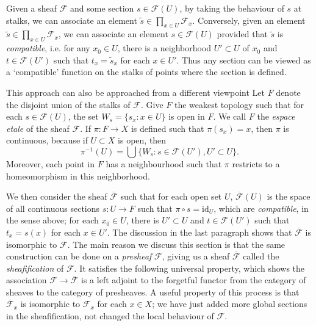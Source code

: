 Given a sheaf $\mathcal{F}$ and some section $s \in \mathcal{F}(U)$, by taking the behaviour of $s$ at stalks, we can associate an element $\tilde{s} \in \prod_{x \in U} \mathcal{F}_x$. Conversely, given an element $\tilde{s} \in \prod_{x \in U} \mathcal{F}_x$, we can associate an element $s \in \mathcal{F}(U)$ provided that $\tilde{s}$ is \emph{compatible}, i.e. for any $x_0 \in U$, there is a neighborhood $U' \subset U$ of $x_0$ and $t \in \mathcal{F}(U')$ such that $t_x = \tilde{s}_x$ for each $x \in U'$. Thus any section can be viewed as a `compatible' function on the stalks of points where the section is defined.

This approach can also be approached from a different viewpoint Let $F$ denote the disjoint union of the stalks of $\mathcal{F}$. Give $F$ the weakest topology such that for each $s \in \mathcal{F}(U)$, the set $W_s = \{ s_x : x \in U \}$ is open in $F$. We call $F$ the \emph{espace etale} of the sheaf $\mathcal{F}$. If $\pi: F \to X$ is defined such that $\pi(s_x) = x$, then $\pi$ is continuous, because if $U \subset X$ is open, then
%
\[ \pi^{-1}(U) = \bigcup \{ W_s : s \in \mathcal{F}(U'), U' \subset U \}. \]
%
Moreover, each point in $F$ has a neighbourhood such that $\pi$ restricts to a homeomorphism in this neighborhood.

We then consider the sheaf $\overline{\mathcal{F}}$ such that for each open set $U$, $\overline{\mathcal{F}}(U)$ is the space of all continuous sections $s: U \to F$ such that $\pi \circ s = \text{id}_U$, which are \emph{compatible}, in the sense above; for each $x_0 \in U$, there is $U' \subset U$ and $t \in \mathcal{F}(U')$ such that $t_x = s(x)$ for each $x \in U'$. The discussion in the last paragraph shows that $\overline{\mathcal{F}}$ is isomorphic to $\mathcal{F}$. The main reason we discuss this section is that the same construction can be done on a \emph{presheaf} $\mathcal{F}$, giving us a sheaf $\overline{\mathcal{F}}$ called the \emph{sheafification} of $\mathcal{F}$. It satisfies the following universal property, which shows the association $\mathcal{F} \to \overline{\mathcal{F}}$ is a left adjoint to the forgetful functor from the category of sheaves to the category of presheaves. A useful property of this process is that $\overline{\mathcal{F}}_x$ is isomorphic to $\mathcal{F}_x$ for each $x \in X$; we have just added more global sections in the sheafification, not changed the local behaviour of $\mathcal{F}$.

